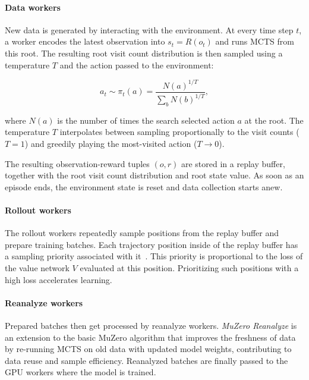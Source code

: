 

\paragraph{Data workers}

New data is generated by interacting with the environment.
At every time step $t$, a worker encodes the latest observation into
$s_t = R(o_t)$ and runs MCTS from this root.
The resulting root visit count distribution is then sampled using a temperature
$T$ and the action passed to the environment:

\begin{equation}\label{eq:ez-visit-policy}
  a_t\sim\pi_t(a)=\frac{N(a)^{1/T}}{\sum_b N(b)^{1/T}},
\end{equation}

where $N(a)$ is the number of times the search selected action $a$ at the
root.
The temperature $T$ interpolates between sampling proportionally to the visit
counts ($T=1$) and greedily playing the most-visited action
($T\rightarrow 0$).

The resulting observation-reward tuples $(o,r)$ are stored in a replay buffer,
together with the root visit count distribution and root state value.
As soon as an episode ends, the environment state is reset and data collection starts anew.

\paragraph{Rollout workers}

The rollout workers repeatedly sample positions from the replay buffer and
prepare training batches.
Each trajectory position inside of the replay buffer has a sampling priority associated with it~\cite{schaul_prioritized_2016}.
This priority is proportional to the loss of the value network $V$ evaluated at this position.
Prioritizing such positions with a high loss accelerates learning.

\paragraph{Reanalyze workers}

Prepared batches then get processed by reanalyze workers.
\emph{MuZero Reanalyze} is an extension to the basic MuZero algorithm that improves the freshness of
data by re-running MCTS on old data with updated model weights, contributing to data reuse and sample efficiency.
Reanalyzed batches are finally passed to the GPU workers where the model is trained.\\

